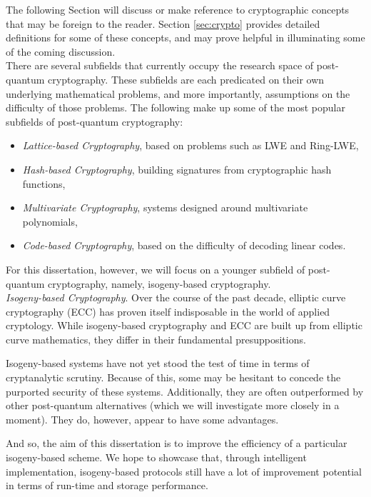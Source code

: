 The following Section will discuss or make reference to cryptographic concepts that may be foreign to the reader. Section  \ref{sec:crypto} provides detailed definitions for some of these concepts, and may prove helpful in illuminating some of the coming discussion.\\

There are several subfields that currently occupy the research space of post-quantum cryptography. These subfields are each predicated on their own underlying mathematical problems, and more importantly, assumptions on the difficulty of those problems. The following make up some of the most popular subfields of post-quantum cryptography: 
\begin{itemize}
\item \textit{Lattice-based Cryptography}, based on problems such as LWE and Ring-LWE, 
\item \textit{Hash-based Cryptography}, building signatures from cryptographic hash functions, 
\item \textit{Multivariate Cryptography}, systems designed around multivariate polynomials, 
\item \textit{Code-based Cryptography}, based on the difficulty of decoding linear codes.
\end{itemize}

For this dissertation, however, we will focus on a younger subfield of post-quantum cryptography, namely, isogeny-based cryptography.\\

\noindent
\textit{Isogeny-based Cryptography}. Over the course of the past decade, elliptic curve cryptography (ECC) has proven itself indisposable in the world of applied cryptology. While isogeny-based cryptography and ECC are built up from elliptic curve mathematics, they differ in their fundamental presuppositions.

Isogeny-based systems have not yet stood the test of time in terms of cryptanalytic scrutiny. Because of this, some may be hesitant to concede the purported security of these systems. Additionally, they are often outperformed by other post-quantum alternatives (which we will investigate more closely in a moment). They do, however, appear to have some advantages. 

And so, the aim of this dissertation is to improve the efficiency of a particular isogeny-based scheme. We hope to showcase that, through intelligent implementation, isogeny-based protocols still have a lot of improvement potential in terms of run-time and storage performance.

